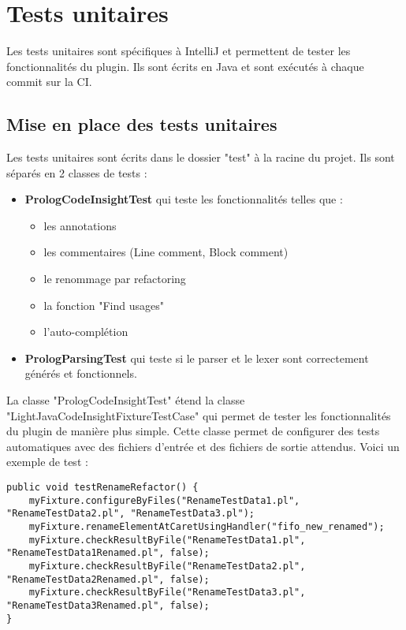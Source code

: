 \chapter{Tests unitaires}
\noindent Les tests unitaires sont spécifiques à IntelliJ et permettent de tester les fonctionnalités du plugin.
Ils sont écrits en Java et sont exécutés à chaque commit sur la CI.


\section{Mise en place des tests unitaires}

\noindent Les tests unitaires sont écrits dans le dossier "test" à la racine du projet.
\newdoubleline Ils sont séparés en 2 classes de tests :
\begin{itemize}
    \item \textbf{PrologCodeInsightTest} qui teste les fonctionnalités telles que :
    \begin{itemize}
        \item les annotations
        \item les commentaires (Line comment, Block comment)
        \item le renommage par refactoring
        \item la fonction "Find usages"
        \item l'auto-complétion
    \end{itemize}
    \item \textbf{PrologParsingTest} qui teste si le parser et le lexer sont correctement générés et fonctionnels.
\end{itemize}

\noindent La classe "PrologCodeInsightTest" étend la classe "LightJavaCodeInsightFixtureTestCase" qui permet de tester les fonctionnalités du plugin de manière plus simple.
\newdoubleline Cette classe permet de configurer des tests automatiques avec des fichiers d'entrée et des fichiers de sortie attendus. Voici un exemple de test :
\begin{lstlisting}[caption={Tests unitaires pour le refactoring}, label={lst:unittests_refactor}]
public void testRenameRefactor() {
    myFixture.configureByFiles("RenameTestData1.pl", "RenameTestData2.pl", "RenameTestData3.pl");
    myFixture.renameElementAtCaretUsingHandler("fifo_new_renamed");
    myFixture.checkResultByFile("RenameTestData1.pl", "RenameTestData1Renamed.pl", false);
    myFixture.checkResultByFile("RenameTestData2.pl", "RenameTestData2Renamed.pl", false);
    myFixture.checkResultByFile("RenameTestData3.pl", "RenameTestData3Renamed.pl", false);
}
\end{lstlisting}

